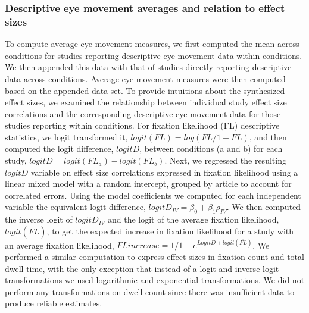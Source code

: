 \subsubsection{Descriptive eye movement averages and relation to effect sizes}

To compute average eye movement measures, we first computed the mean across conditions for studies reporting descriptive eye movement data within conditions. We then appended this data with that of studies directly reporting descriptive data across conditions. Average eye movement measures were then computed based on the appended data set. To provide intuitions about the synthesized effect sizes, we examined the relationship between individual study effect size correlations and the corresponding descriptive eye movement data for those studies reporting within conditions. For fixation likelihood (FL) descriptive statistics, we logit transformed it, $logit(FL) = log(FL/1 - FL)$, and then computed the logit difference, $logitD$, between conditions (a and b) for each study, $logitD = logit(FL_{a}) - logit(FL_{b})$. Next, we regressed the resulting $logitD$ variable on effect size correlations expressed in fixation likelihood using a linear mixed model with a random intercept, grouped by article to account for correlated errors. Using the model coefficients we computed for each independent variable the equivalent logit difference, $logitD_{IV} = \beta_{0} + \beta_{1}\rho_{IV}$. We then computed the inverse logit of $logitD_{IV}$ and the logit of the average fixation likelihood, $logit(\overline{FL})$, to get the expected increase in fixation likelihood for a study with an average fixation likelihood, $FL increase = 1 / 1 + e^{LogitD + logit(\overline{FL})}$. We performed a similar computation to express effect sizes in fixation count and total dwell time, with the only exception that instead of a logit and inverse logit transformations we used logarithmic and exponential transformations. We did not perform any transformations on dwell count since there was insufficient data to produce reliable estimates.